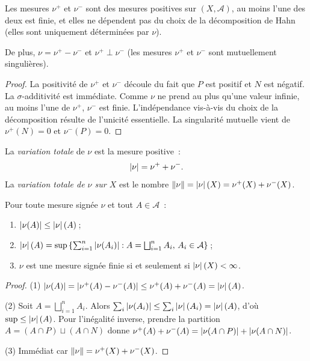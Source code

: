 \begin{theoreme}
Les mesures $\nu^+$ et $\nu^-$ sont des mesures positives sur $(X, \mathcal{A})$,
au moins l'une des deux est finie, et elles ne d\'ependent pas du choix de la
d\'ecomposition de Hahn (elles sont uniquement d\'etermin\'ees par $\nu$).

De plus, $\nu = \nu^+ - \nu^-$ et $\nu^+ \perp \nu^-$ (les mesures $\nu^+$ et
$\nu^-$ sont mutuellement singuli\`eres).
\end{theoreme}

\begin{proof}
La positivit\'e de $\nu^+$ et $\nu^-$ d\'ecoule du fait que $P$ est positif et $N$
est n\'egatif. La $\sigma$-additivit\'e est imm\'ediate. Comme $\nu$ ne prend au plus
qu'une valeur infinie, au moins l'une de $\nu^+$, $\nu^-$ est finie. L'ind\'ependance
vis-\`a-vis du choix de la d\'ecomposition r\'esulte de l'unicit\'e essentielle.
La singularit\'e mutuelle vient de $\nu^+(N) = 0$ et $\nu^-(P) = 0$.
\end{proof}

\begin{definition}
\label{def:variation_totale}
La \emph{variation totale} de $\nu$ est la mesure positive~:
\[
    \left| \nu \right| = \nu^+ + \nu^-.
\]
La \emph{variation totale de $\nu$ sur $X$} est le nombre
$\left\| \nu \right\| = \left| \nu \right|(X) = \nu^+(X) + \nu^-(X)$.
\end{definition}

\begin{proposition}
Pour toute mesure sign\'ee $\nu$ et tout $A \in \mathcal{A}$~:
\begin{enumerate}
    \item $\left| \nu(A) \right| \leq \left| \nu \right|(A)$\,;
    \item $\left| \nu \right|(A) = \sup\left\{\sum_{i=1}^n \left| \nu(A_i) \right| :
    A = \bigsqcup_{i=1}^n A_i,\, A_i \in \mathcal{A}\right\}$\,;
    \item $\nu$ est une mesure sign\'ee finie si et seulement si
    $\left| \nu \right|(X) < \infty$.
\end{enumerate}
\end{proposition}

\begin{proof}
(1) $\left| \nu(A) \right| = \left| \nu^+(A) - \nu^-(A) \right| \leq \nu^+(A) + \nu^-(A) = \left| \nu \right|(A)$.

(2) Soit $A = \bigsqcup_{i=1}^n A_i$. Alors
$\sum_i \left| \nu(A_i) \right| \leq \sum_i \left| \nu \right|(A_i) = \left| \nu \right|(A)$, d'o\`u
$\sup \leq \left| \nu \right|(A)$. Pour l'in\'egalit\'e inverse, prendre la partition
$A = (A \cap P) \sqcup (A \cap N)$ donne
$\nu^+(A) + \nu^-(A) = \left| \nu(A \cap P) \right| + \left| \nu(A \cap N) \right|$.

(3) Imm\'ediat car $\left\| \nu \right\| = \nu^+(X) + \nu^-(X)$.
\end{proof}

